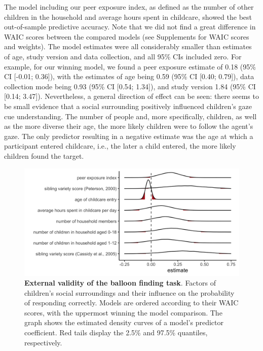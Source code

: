 \documentclass[
  man,floatsintext]{apa6}
\begin{document}
The model including our peer exposure index, as defined as the number of other children in the household and average hours spent in childcare, showed the best out-of-sample predictive accuracy. Note that we did not find a great difference in WAIC scores between the compared models (see Supplements for WAIC scores and weights). The model estimates were all considerably smaller than estimates of age, study version and data collection, and all 95\% CIs included zero. For example, for our winning model, we found a peer exposure estimate of
0.18 (95\% CI {[}-0.01; 0.36{]}),
with the estimates of age being 0.59 (95\% CI {[}0.40; 0.79{]}), data collection mode being 0.93 (95\% CI {[}0.54; 1.34{]}), and study version 1.84 (95\% CI {[}0.14; 3.47{]}). Nevertheless, a general direction of effect can be seen: there seems to be small evidence that a social surrounding positively influenced children's gaze cue understanding. The number of people and, more specifically, children, as well as the more diverse their age, the more likely children were to follow the agent's gaze. The only predictor resulting in a negative estimate was the age at which a participant entered childcare, i.e., the later a child entered, the more likely children found the target.




\begin{figure}

{\centering \includegraphics[width=1\linewidth]{../figures/extvali-posteriorsample} 

}

\caption{\textbf{External validity of the balloon finding task}.
Factors of children's social surroundings and their influence on the probability of responding correctly. Models are ordered according to their WAIC scores, with the uppermost winning the model comparison. The graph shows the estimated density curves of a model's predictor coefficient. Red tails display the 2.5\% and 97.5\% quantiles, respectively.}\label{fig:fig4}
\end{figure}
\end{document}
